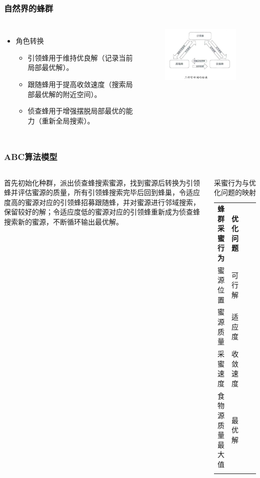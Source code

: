 \begin{frame}
	\frametitle{自然界的蜂群}
	\begin{columns}
		\begin{itemize}
			\item {角色转换}
				\begin{itemize}
					\item {引领蜂用于维持优良解（记录当前局部最优解）。}
					\item {跟随蜂用于提高收敛速度（搜索局部最优解的附近空间）。}
					\item {侦查蜂用于增强摆脱局部最优的能力（重新全局搜索）。}
				\end{itemize}
		\end{itemize}
		\begin{figure}[htbp]
			\centering
			\includegraphics[width=6cm]{pic/bee5.png}
		\end{figure}
	\end{columns}
\end{frame}

\begin{frame}
	\frametitle{ABC算法模型}
	\begin{columns}
	\column{.6\textwidth}
	\qquad 首先初始化种群，派出侦查蜂搜索蜜源，找到蜜源后转换为引领蜂并评估蜜源的质量，所有引领蜂搜索完毕后回到蜂巢，令适应度高的蜜源对应的引领蜂招募跟随蜂，并对蜜源进行邻域搜索，保留较好的解；令适应度低的蜜源对应的引领蜂重新成为侦查蜂搜索新的蜜源，不断循环输出最优解。
	\column{.4\textwidth}
	\begin{table}[]
	\centering
	\caption{采蜜行为与优化问题的映射}
	\label{采蜜行为与优化问题的映射}
	\begin{tabular}{ccll}
	\cline{1-2}
	\multicolumn{1}{|c|}{\textbf{蜂群采蜜行为}} & \multicolumn{1}{c|}{\textbf{优化问题}} &  &  \\ \cline{1-2}
	\multicolumn{1}{|c|}{蜜源位置}            & \multicolumn{1}{c|}{可行解}            &  &  \\ \cline{1-2}
	\multicolumn{1}{|c|}{蜜源质量}            & \multicolumn{1}{c|}{适应度}            &  &  \\ \cline{1-2}
	\multicolumn{1}{|c|}{采蜜速度}            & \multicolumn{1}{c|}{收敛速度}           &  &  \\ \cline{1-2}
	\multicolumn{1}{|c|}{食物源质量最大值}        & \multicolumn{1}{c|}{最优解}            &  &  \\ \cline{1-2}
	\multicolumn{1}{l}{}                  & \multicolumn{1}{l}{}                &  & 
	\end{tabular}
	\end{table}
	\end{columns}
\end{frame}




